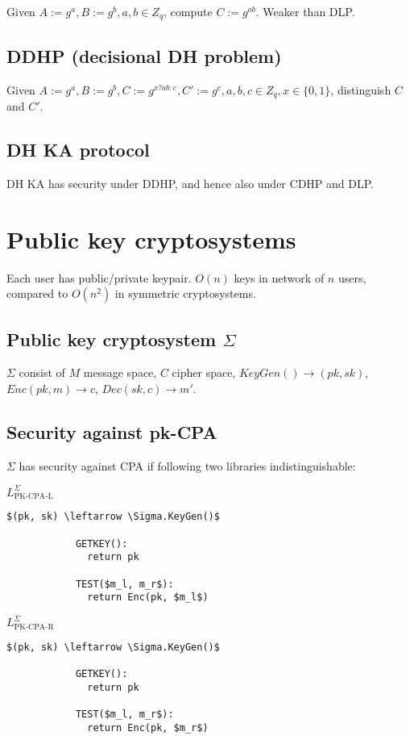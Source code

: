 \documentclass[a4paper]{scrreprt}
\begin{document}
Given $A := g^a, B := g^b, a, b \in Z_q$, compute $C := g^{ab}$. Weaker than
DLP.

\section{DDHP (decisional DH problem)}

Given $A := g^a, B := g^b, C := g^{x ? ab : c}, C' := g^c, a, b, c \in Z_q, x
\in \{0, 1\}$, distinguish $C$ and $C'$.

\section{DH KA protocol}

DH KA has security under DDHP, and hence also under CDHP and DLP.

\chapter{Public key cryptosystems}

Each user has public/private keypair. $O(n)$ keys in network of $n$ users,
compared to $O(n^2)$ in symmetric cryptosystems.

\section{Public key cryptosystem $\Sigma$}

$\Sigma$ consist of $M$ message space, $C$ cipher space, $KeyGen() \rightarrow
(pk, sk)$, $Enc(pk, m) \rightarrow c$, $Dec(sk, c) \rightarrow m'$.

\section{Security against pk-CPA}

$\Sigma$ has security against CPA if following two libraries indistinguishable:

\begin{tcbraster}[raster columns=2,raster equal height,nobeforeafter,raster column skip=2cm]
	\begin{library}{$L^\Sigma_{\text{PK-CPA-L}}$}
		\begin{lstlisting}[mathescape=true,autogobble=true]
			$(pk, sk) \leftarrow \Sigma.KeyGen()$

			GETKEY():
			  return pk

			TEST($m_l, m_r$):
			  return Enc(pk, $m_l$)
		\end{lstlisting}
	\end{library}
	\begin{library}{$L^\Sigma_{\text{PK-CPA-R}}$}
		\begin{lstlisting}[mathescape=true,autogobble=true]
			$(pk, sk) \leftarrow \Sigma.KeyGen()$

			GETKEY():
			  return pk

			TEST($m_l, m_r$):
			  return Enc(pk, $m_r$)
		\end{lstlisting}
	\end{library}
\end{tcbraster}
\end{document}
